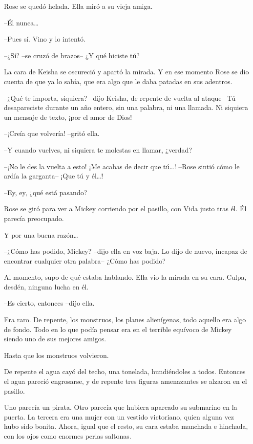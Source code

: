 {Rose se quedó helada. Ella miró a su vieja amiga.}

{--Él nunca\ldots{}}

{--Pues sí. Vino y lo intentó.}

{--¿Sí? --se cruzó de brazos-- ¿Y qué hiciste tú?}

{La cara de Keisha se oscureció y apartó la mirada. Y en ese momento
 Rose se dio cuenta de que ya lo sabía, que era algo que le daba patadas
en sus adentros.}

{--¿Qué te importa, siquiera? --dijo Keisha, de repente de vuelta al
 ataque-- Tú desapareciste durante un año entero, sin una palabra, ni una
llamada. Ni siquiera un mensaje de texto, ¡por el amor de Dios!}

{--¡Creía que volvería! --gritó ella.}

{--Y cuando vuelves, ni siquiera te molestas en llamar, ¿verdad?}

{--¡No le des la vuelta a esto! ¡Me acabas de decir que tú\ldots{}!
 --Rose sintió cómo le ardía la garganta-- ¡Que tú y él\ldots{}!}

{--Ey, ey, ¿qué está pasando?}

{Rose se giró para ver a Mickey corriendo por el pasillo, con Vida justo
tras él. Él parecía preocupado.}

{Y por una buena razón\ldots{}}

{--¿Cómo has podido, Mickey? --dijo ella en voz baja. Lo dijo de nuevo,
incapaz de encontrar cualquier otra palabra-- ¿Cómo has podido?}

{Al momento, supo de qué estaba hablando. Ella vio la mirada en su cara.
Culpa, desdén, ninguna lucha en él.}

{--Es cierto, entonces --dijo ella.}

{Era raro. De repente, los monstruos, los planes alienígenas, todo
 aquello era algo de fondo. Todo en lo que podía pensar era en el
terrible equívoco de Mickey siendo uno de sus mejores amigos.}

{Hasta que los monstruos volvieron.}

{De repente el agua cayó del techo, una tonelada, hundiéndoles a todos.
 Entonces el agua pareció engrosarse, y de repente tres figuras
amenazantes se alzaron en el pasillo.}

{Uno parecía un pirata. Otro parecía que hubiera aparcado su submarino
 en la puerta. La tercera era una mujer con un vestido victoriano, quien
 alguna vez hubo sido bonita. Ahora, igual que el resto, su cara estaba
manchada e hinchada, con los ojos como enormes perlas saltonas.}

